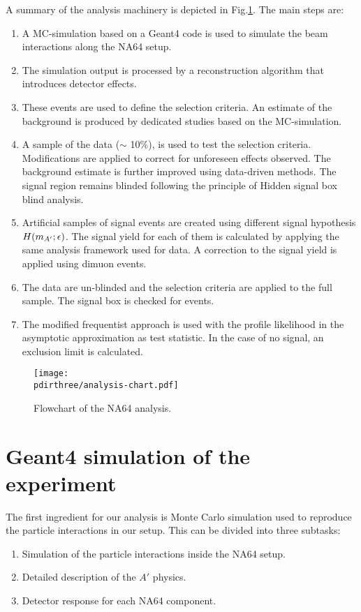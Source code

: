 A summary of the analysis machinery is depicted in Fig.\ref{fig:analysis-chart}. The main steps are:
\begin{enumerate}
\item A MC-simulation based on a Geant4 code is used to simulate the beam interactions along the NA64 setup.
\item The simulation output is processed by a reconstruction algorithm that introduces detector effects.
\item These events are used to define the selection criteria. An estimate of the background is produced by dedicated studies based on the MC-simulation.
\item A sample of the data ($\sim$ 10\%), is used to test the selection criteria. Modifications are applied to correct for unforeseen effects observed. The background estimate is further improved using data-driven methods. The signal region remains blinded following the principle of Hidden signal box blind analysis.
\item Artificial samples of signal events are created using different signal hypothesis $H(m_{A'};\epsilon)$. The signal yield for each of them is calculated by applying the same analysis framework used for data. A correction to the signal yield is applied using dimuon events.
\item The data are un-blinded and the selection criteria are applied to the full sample. The signal box is checked for events.
\item The modified frequentist approach is used with the profile likelihood in the asymptotic approximation as test statistic. In the case of no signal, an exclusion limit is calculated.
\end{enumerate}

\begin{figure}[bth!]
  \centering
  \texttt{[image: \\pdirthree/analysis-chart.pdf]}
  \caption{Flowchart of the NA64 analysis.}
  \label{fig:analysis-chart}
\end{figure}

\section{Geant4 simulation of the experiment}
\label{ch3:sec:geant4}

The first ingredient for our analysis is Monte Carlo simulation used to reproduce the particle interactions in our setup. This can be divided into three subtasks:
\begin{enumerate}
\item Simulation of the particle interactions inside the NA64 setup.
\item Detailed description of the $A'$ physics.  
\item Detector response for each NA64 component.  
\end{enumerate}

